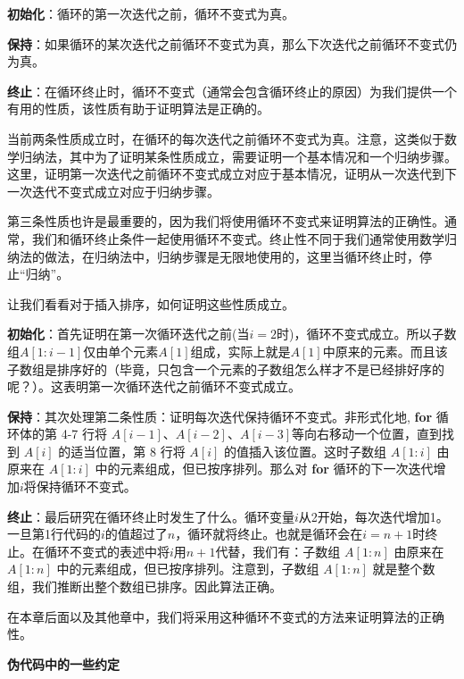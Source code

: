\documentclass[lang=cn,newtx,10pt,scheme=chinese]{elegantbook}
\begin{document}
\textbf{初始化}：循环的第一次迭代之前，循环不变式为真。

\textbf{保持}：如果循环的某次迭代之前循环不变式为真，那么下次迭代之前循环不变式仍为真。

\textbf{终止}：在循环终止时，循环不变式（通常会包含循环终止的原因）为我们提供一个有用的性质，该性质有助于证明算法是正确的。

当前两条性质成立时，在循环的每次迭代之前循环不变式为真。注意，这类似于数学归纳法，其中为了证明某条性质成立，需要证明一个基本情况和一个归纳步骤。这里，证明第一次迭代之前循环不变式成立对应于基本情况，证明从一次迭代到下一次迭代不变式成立对应于归纳步骤。

第三条性质也许是最重要的，因为我们将使用循环不变式来证明算法的正确性。通常，我们和循环终止条件一起使用循环不变式。终止性不同于我们通常使用数学归纳法的做法，在归纳法中，归纳步骤是无限地使用的，这里当循环终止时，停止``归纳''。

让我们看看对于插入排序，如何证明这些性质成立。

\textbf{初始化}：首先证明在第一次循环迭代之前(当$i=2$时)，循环不变式成立。所以子数组$A[1:i-1]$仅由单个元素$A[1]$组成，实际上就是$A[1]$中原来的元素。而且该子数组是排序好的（毕竟，只包含一个元素的子数组怎么样才不是已经排好序的呢？）。这表明第一次循环迭代之前循环不变式成立。

\textbf{保持}：其次处理第二条性质：证明每次迭代保持循环不变式。非形式化地, \textbf{for} 循环体的第 4-7 行将 $A[i-1]$、$A[i-2]$、$A[i-3]$等向右移动一个位置，直到找到 $A[i]$ 的适当位置，第 8 行将 $A[i]$ 的值插入该位置。这时子数组 $A[1:i]$ 由原来在 $A[1:i]$ 中的元素组成，但已按序排列。那么对 \textbf{for} 循环的下一次迭代增加$i$将保持循环不变式。

\textbf{终止}：最后研究在循环终止时发生了什么。循环变量$i$从2开始，每次迭代增加1。一旦第1行代码的$i$的值超过了$n$，循环就将终止。也就是循环会在$i=n+1$时终止。在循环不变式的表述中将$i$用$n+1$代替，我们有：子数组 $A[1:n]$ 由原来在 $A[1:n]$ 中的元素组成，但已按序排列。注意到，子数组 $A[1:n]$ 就是整个数组，我们推断出整个数组已排序。因此算法正确。

在本章后面以及其他章中，我们将采用这种循环不变式的方法来证明算法的正确性。

\textbf{伪代码中的一些约定}
\end{document}
